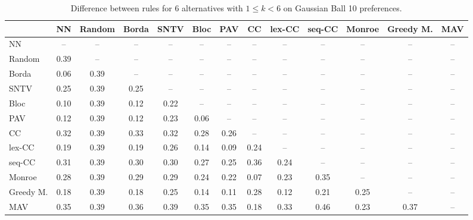 
\begin{table*}[htbp]
\centering
\begin{tabular}{lcccccccccccc}
\toprule
 & NN & Random & Borda & SNTV & Bloc & PAV & CC & lex-CC & seq-CC & Monroe & Greedy M. & MAV \\
\midrule
NN & -- & -- & -- & -- & -- & -- & -- & -- & -- & -- & -- & -- \\
Random & \cellcolor{blue!39} 0.39 & -- & -- & -- & -- & -- & -- & -- & -- & -- & -- & -- \\
Borda & \cellcolor{blue!6} 0.06 & \cellcolor{blue!39} 0.39 & -- & -- & -- & -- & -- & -- & -- & -- & -- & -- \\
SNTV & \cellcolor{blue!25} 0.25 & \cellcolor{blue!39} 0.39 & \cellcolor{blue!25} 0.25 & -- & -- & -- & -- & -- & -- & -- & -- & -- \\
Bloc & \cellcolor{blue!10} 0.10 & \cellcolor{blue!39} 0.39 & \cellcolor{blue!12} 0.12 & \cellcolor{blue!22} 0.22 & -- & -- & -- & -- & -- & -- & -- & -- \\
PAV & \cellcolor{blue!12} 0.12 & \cellcolor{blue!39} 0.39 & \cellcolor{blue!12} 0.12 & \cellcolor{blue!23} 0.23 & \cellcolor{blue!6} 0.06 & -- & -- & -- & -- & -- & -- & -- \\
CC & \cellcolor{blue!32} 0.32 & \cellcolor{blue!39} 0.39 & \cellcolor{blue!33} 0.33 & \cellcolor{blue!32} 0.32 & \cellcolor{blue!28} 0.28 & \cellcolor{blue!26} 0.26 & -- & -- & -- & -- & -- & -- \\
lex-CC & \cellcolor{blue!19} 0.19 & \cellcolor{blue!39} 0.39 & \cellcolor{blue!19} 0.19 & \cellcolor{blue!26} 0.26 & \cellcolor{blue!14} 0.14 & \cellcolor{blue!9} 0.09 & \cellcolor{blue!24} 0.24 & -- & -- & -- & -- & -- \\
seq-CC & \cellcolor{blue!31} 0.31 & \cellcolor{blue!39} 0.39 & \cellcolor{blue!30} 0.30 & \cellcolor{blue!30} 0.30 & \cellcolor{blue!27} 0.27 & \cellcolor{blue!25} 0.25 & \cellcolor{blue!36} 0.36 & \cellcolor{blue!24} 0.24 & -- & -- & -- & -- \\
Monroe & \cellcolor{blue!28} 0.28 & \cellcolor{blue!39} 0.39 & \cellcolor{blue!28} 0.29 & \cellcolor{blue!28} 0.29 & \cellcolor{blue!24} 0.24 & \cellcolor{blue!22} 0.22 & \cellcolor{blue!7} 0.07 & \cellcolor{blue!23} 0.23 & \cellcolor{blue!35} 0.35 & -- & -- & -- \\
Greedy M. & \cellcolor{blue!18} 0.18 & \cellcolor{blue!39} 0.39 & \cellcolor{blue!18} 0.18 & \cellcolor{blue!25} 0.25 & \cellcolor{blue!14} 0.14 & \cellcolor{blue!11} 0.11 & \cellcolor{blue!28} 0.28 & \cellcolor{blue!12} 0.12 & \cellcolor{blue!21} 0.21 & \cellcolor{blue!25} 0.25 & -- & -- \\
MAV & \cellcolor{blue!35} 0.35 & \cellcolor{blue!39} 0.39 & \cellcolor{blue!36} 0.36 & \cellcolor{blue!39} 0.39 & \cellcolor{blue!35} 0.35 & \cellcolor{blue!35} 0.35 & \cellcolor{blue!18} 0.18 & \cellcolor{blue!33} 0.33 & \cellcolor{blue!46} 0.46 & \cellcolor{blue!23} 0.23 & \cellcolor{blue!37} 0.37 & -- \\
\bottomrule
\end{tabular}

\caption{Difference between rules for 6 alternatives with $1 \leq k < 6$ on Gaussian Ball 10 preferences.}
\label{tab:rule_distance_heatmap-m=[6]-pref_dist=euclidean__args__dimensions=10_-_space=gaussian_ball}
\end{table*}
    
